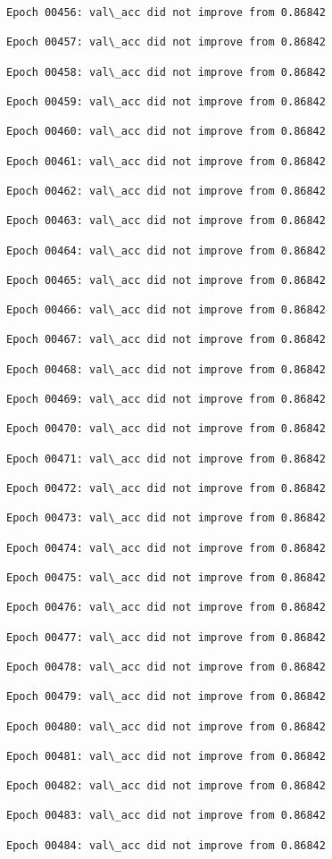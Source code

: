 \documentclass[11pt]{article}
\begin{document}
\begin{Verbatim}[commandchars=\\\{\}]
Epoch 00456: val\_acc did not improve from 0.86842

Epoch 00457: val\_acc did not improve from 0.86842

Epoch 00458: val\_acc did not improve from 0.86842

Epoch 00459: val\_acc did not improve from 0.86842

Epoch 00460: val\_acc did not improve from 0.86842

Epoch 00461: val\_acc did not improve from 0.86842

Epoch 00462: val\_acc did not improve from 0.86842

Epoch 00463: val\_acc did not improve from 0.86842

Epoch 00464: val\_acc did not improve from 0.86842

Epoch 00465: val\_acc did not improve from 0.86842

Epoch 00466: val\_acc did not improve from 0.86842

Epoch 00467: val\_acc did not improve from 0.86842

Epoch 00468: val\_acc did not improve from 0.86842

Epoch 00469: val\_acc did not improve from 0.86842

Epoch 00470: val\_acc did not improve from 0.86842

Epoch 00471: val\_acc did not improve from 0.86842

Epoch 00472: val\_acc did not improve from 0.86842

Epoch 00473: val\_acc did not improve from 0.86842

Epoch 00474: val\_acc did not improve from 0.86842

Epoch 00475: val\_acc did not improve from 0.86842

Epoch 00476: val\_acc did not improve from 0.86842

Epoch 00477: val\_acc did not improve from 0.86842

Epoch 00478: val\_acc did not improve from 0.86842

Epoch 00479: val\_acc did not improve from 0.86842

Epoch 00480: val\_acc did not improve from 0.86842

Epoch 00481: val\_acc did not improve from 0.86842

Epoch 00482: val\_acc did not improve from 0.86842

Epoch 00483: val\_acc did not improve from 0.86842

Epoch 00484: val\_acc did not improve from 0.86842


\end{Verbatim}
\end{document}
